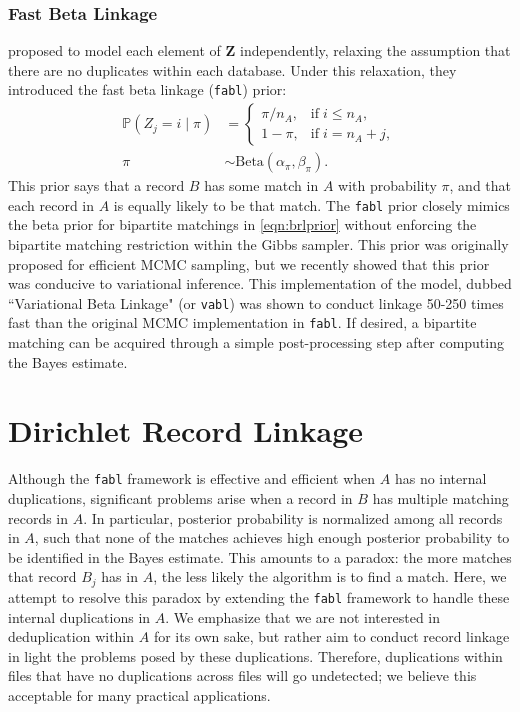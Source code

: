 \documentclass[12pt,letterpaper]{article}
\newcommand{\1}[1]{\mathbb{I}\!\left[#1\right]} %
\begin{document}
\subsubsection{Fast Beta Linkage}\label{sec:fabl}

\cite{kundinger_2023} proposed to model each element of $\bm{Z}$ independently, relaxing the assumption that there are no duplicates within each database. Under this relaxation, they introduced the fast beta linkage (\texttt{fabl}) prior:
\begin{align}\label{eqn:fabl}
	\mathbb{P}(Z_j = i \mid \pi) 
	&=
	\begin{cases}
		\pi/n_A,  &  \text{if}  \; i\leq n_A,\\
		1- \pi, &   \text{if}  \;  i= n_A + j,
	\end{cases} \\
	\pi &\sim \text{Beta}(\alpha_{\pi}, \beta_{\pi}).
\end{align}
This prior says that a record $B$ has some match in $A$ with probability $\pi$, and that each record in $A$ is equally likely to be that match. The \texttt{fabl} prior closely mimics the beta prior for bipartite matchings in \eqref{eqn:brlprior} without enforcing the bipartite matching restriction within the Gibbs sampler. This prior was originally proposed for efficient MCMC sampling, but we recently showed that this prior was conducive to variational inference. This implementation of the model, dubbed ``Variational Beta Linkage" (or \texttt{vabl}) was shown to conduct linkage 50-250 times fast than the original MCMC implementation in \texttt{fabl}\citep{kundinger_2024_vabl}. If desired, a bipartite matching can be acquired through a simple post-processing step after computing the Bayes estimate. 

\section{Dirichlet Record Linkage}\label{sec:drl}


Although the \texttt{fabl} framework is effective and efficient when $A$ has no internal duplications, significant problems arise when a record in $B$ has multiple matching records in $A$. In particular, posterior probability is normalized among all records in $A$, such that none of the matches achieves high enough posterior probability to be identified in the Bayes estimate. This amounts to a paradox: the more matches that record $B_j$ has in $A$, the less likely the algorithm is to find a match. Here, we attempt to resolve this paradox by extending the \texttt{fabl} framework to handle these internal duplications in $A$. We emphasize that we are not interested in deduplication within $A$ for its own sake, but rather aim to conduct record linkage in light the problems posed by these duplications. Therefore, duplications within files that have no duplications across files will go undetected; we believe this acceptable for many practical applications. 
\end{document}

